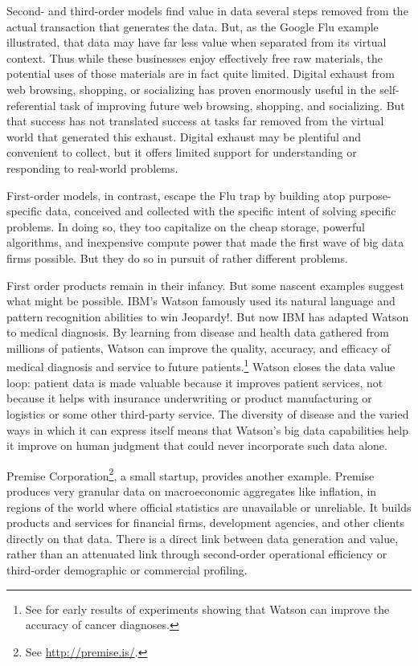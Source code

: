 \documentclass[12pt]{article}
\begin{document}
Second- and third-order models find value in data
several steps removed from the actual transaction that generates the
data. But, as the Google Flu example illustrated, that data may have
far less value when separated from its virtual context. Thus while
these businesses enjoy effectively free raw materials, the potential
uses of those materials are in fact quite limited. Digital exhaust
from web browsing, shopping, or socializing has proven enormously
useful in the self-referential task of improving future web browsing, shopping, and
socializing. But that success has not translated success at tasks far
removed from the virtual world that generated this exhaust. Digital
exhaust may be plentiful and convenient to collect, but it offers
limited support for understanding or responding to real-world problems.

First-order models, in contrast, escape the Flu trap by building atop
purpose-specific data, conceived and collected with the specific
intent of solving specific problems. In doing so, they too capitalize
on the cheap storage, powerful algorithms, and inexpensive compute
power that made the first wave of big data firms possible. But they do
so in pursuit of rather different problems.

First order products remain in their infancy. But some nascent
examples suggest what might be possible. IBM's Watson famously used
its natural language and pattern recognition abilities to win
Jeopardy!. But now IBM has adapted Watson to medical diagnosis. By
learning from disease and health data gathered from millions of
patients, Watson can improve the quality, accuracy, and efficacy of
medical diagnosis and service to future patients.\footnote{See
\cite{wired2013a} for early results of experiments showing that Watson
can improve the accuracy of cancer diagnoses.} Watson closes the data
value loop: patient data is made valuable because it improves patient
services, not because it helps with insurance underwriting or product
manufacturing or logistics or some other third-party service. The
diversity of disease and the varied ways in which it can express
itself means that Watson's big data capabilities help it improve on
human judgment that could never incorporate such data alone.

Premise Corporation\footnote{See \url{http://premise.is/}.}, a small startup, provides another
example. Premise produces very granular data on macroeconomic
aggregates like inflation, in regions of the world where official
statistics are unavailable or unreliable. It builds products and
services for financial firms, development agencies, and other clients
directly on that data. There is a direct link between data
generation and value, rather than an attenuated link through
second-order operational efficiency or third-order demographic or
commercial profiling. 
\end{document}
